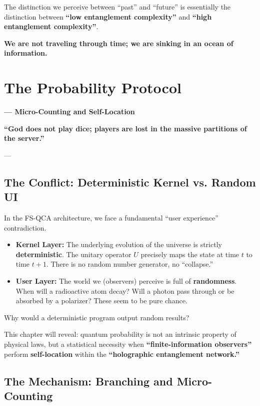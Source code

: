 \documentclass[11pt,a4paper,twoside]{book}
\begin{document}
The distinction we perceive between ``past'' and ``future'' is essentially the distinction between \textbf{``low entanglement complexity''} and \textbf{``high entanglement complexity''}.

\textbf{We are not traveling through time; we are sinking in an ocean of information.}

 \section{The Probability Protocol}

\textbf{--- Micro-Counting and Self-Location}

\textbf{``God does not play dice; players are lost in the massive partitions of the server.''}

---

\subsection{The Conflict: Deterministic Kernel vs. Random UI}

In the FS-QCA architecture, we face a fundamental ``user experience'' contradiction.

\begin{itemize}
\item \textbf{Kernel Layer:} The underlying evolution of the universe is strictly \textbf{deterministic}. The unitary operator \textbf{$U$} precisely maps the state at time \textbf{$t$} to time \textbf{$t+1$}. There is no random number generator, no ``collapse.''

\item \textbf{User Layer:} The world we (observers) perceive is full of \textbf{randomness}. When will a radioactive atom decay? Will a photon pass through or be absorbed by a polarizer? These seem to be pure chance.
\end{itemize}

Why would a deterministic program output random results?

This chapter will reveal: quantum probability is not an intrinsic property of physical laws, but a statistical necessity when \textbf{``finite-information observers''} perform \textbf{self-location} within the \textbf{``holographic entanglement network.''}

\subsection{The Mechanism: Branching and Micro-Counting}
\end{document}
